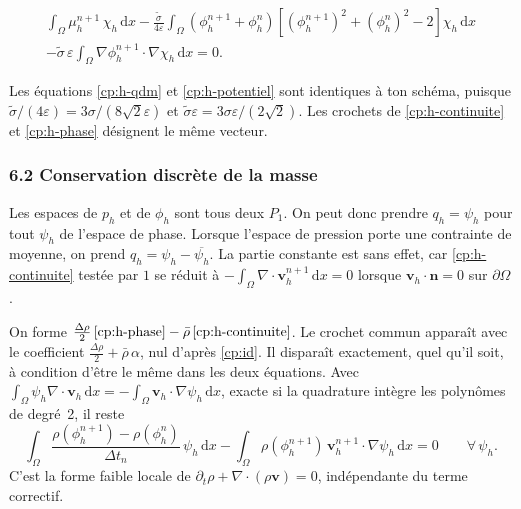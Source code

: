 \begin{multline}\label{cp:h-potentiel}
  \int_{\Omega} \mu_h^{n+1}\,\chi_h\,\mathrm{d}x
  - \frac{\tilde{\sigma}}{4\varepsilon}\int_{\Omega}
    \left(\phi_h^{n+1}+\phi_h^{n}\right)\left[(\phi_h^{n+1})^{2} + (\phi_h^{n})^{2} - 2\right]\chi_h\,\mathrm{d}x\\
  - \tilde{\sigma}\,\varepsilon\int_{\Omega} \nabla\phi_h^{n+1}\cdot\nabla\chi_h\,\mathrm{d}x = 0 .
\end{multline}

Les équations \eqref{cp:h-qdm} et \eqref{cp:h-potentiel} sont identiques à ton schéma, puisque $\tilde{\sigma}/(4\varepsilon) = 3\sigma/(8\sqrt{2}\varepsilon)$ et $\tilde{\sigma}\varepsilon = 3\sigma\varepsilon/(2\sqrt{2})$. Les crochets de \eqref{cp:h-continuite} et \eqref{cp:h-phase} désignent le même vecteur.

\subsubsection*{6.2 Conservation discrète de la masse}

Les espaces de $p_h$ et de $\phi_h$ sont tous deux $P_1$. On peut donc prendre $q_h=\psi_h$ pour tout $\psi_h$ de l'espace de phase. Lorsque l'espace de pression porte une contrainte de moyenne, on prend $q_h=\psi_h-\overline{\psi_h}$. La partie constante est sans effet, car \eqref{cp:h-continuite} testée par $1$ se réduit à $-\int_{\Omega}\nabla\cdot\mathbf{v}_h^{n+1}\,\mathrm{d}x = 0$ lorsque $\mathbf{v}_h\cdot\mathbf{n}=0$ sur $\partial\Omega$.

On forme $\frac{\Delta\rho}{2}\,\eqref{cp:h-phase} - \bar{\rho}\,\eqref{cp:h-continuite}$. Le crochet commun apparaît avec le coefficient $\frac{\Delta\rho}{2} + \bar{\rho}\,\alpha$, nul d'après \eqref{cp:id}. Il disparaît exactement, quel qu'il soit, à condition d'être le même dans les deux équations. Avec $\int_\Omega\psi_h\nabla\cdot\mathbf{v}_h\,\mathrm{d}x = -\int_\Omega\mathbf{v}_h\cdot\nabla\psi_h\,\mathrm{d}x$, exacte si la quadrature intègre les polynômes de degré~2, il reste
\begin{equation}\label{cp:masse-discrete}
  \int_{\Omega}\frac{\rho(\phi_h^{n+1})-\rho(\phi_h^{n})}{\Delta t_n}\,\psi_h\,\mathrm{d}x
  - \int_{\Omega}\rho(\phi_h^{n+1})\,\mathbf{v}_h^{n+1}\cdot\nabla\psi_h\,\mathrm{d}x = 0
  \qquad \forall\,\psi_h .
\end{equation}
C'est la forme faible locale de $\partial_t\rho+\nabla\cdot(\rho\mathbf{v})=0$, indépendante du terme correctif.

